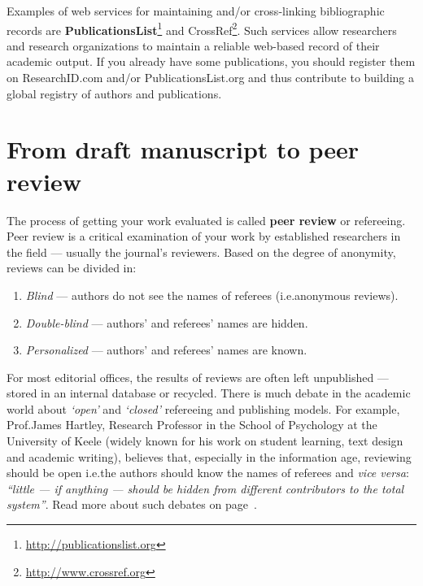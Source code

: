\documentclass[graybox,envcountchap,sectrefs,UStrade]{svmono}
\begin{document}
Examples of web services for maintaining and/or cross-linking bibliographic records are \textbf{PublicationsList}\footnote{\url{http://publicationslist.org}} and CrossRef\footnote{\url{http://www.crossref.org}}. Such services allow researchers and research organizations to maintain a reliable web-based record of their academic output. If you already have some publications, you should register them on ResearchID.com and/or PublicationsList.org and thus contribute to building a global registry of authors and publications.\par


\section{From draft manuscript to peer review}\label{sec:filtering}

The process of getting your work evaluated is called \textbf{peer review} or refereeing. Peer review is a critical examination of your work by established researchers in the field --- usually the journal's reviewers. Based on the degree of anonymity, reviews can be divided in:

\begin{enumerate}
  \item \emph{Blind} --- authors do not see the names of referees (i.e.\@ anonymous reviews).
  \item \emph{Double-blind} --- authors' and referees' names are hidden.
  \item \emph{Personalized} --- authors' and referees' names are known.
\end{enumerate}

For most editorial offices, the results of reviews are often left unpublished --- stored in an internal database or recycled. There is much debate in the academic world about \emph{`open'} and \emph{`closed'} refereeing and publishing models. For example, Prof.\@ James Hartley, Research Professor in the School of Psychology at the University of Keele (widely known for his work on student learning, text design and academic writing), believes that, especially in the information age, reviewing should be open i.e.\@ the authors should know the names of referees and \emph{vice versa}: \emph{``little --- if anything --- should be hidden from different contributors to the total system''}. Read more about such debates on page~\pageref{sec:publishing_models}. \par
\end{document}
